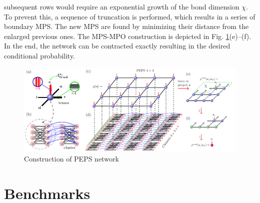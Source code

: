 subsequent rows would require an exponential growth of the bond dimension
$\chi$. To prevent this, a sequence of truncation is performed, which results
in a series of boundary MPS. The new MPS are found by minimizing their distance
from the enlarged previous ones. The MPS-MPO construction is depicted in Fig.
\ref{fig:tensors}(e)--(f). In the end, the network can be contracted exactly
resulting in the desired conditional probability.
\begin{figure}
  \includegraphics[width=\textwidth]{figures/peps.pdf}
  \caption{Construction of PEPS network} \label{fig:tensors}
\end{figure}

\section{Benchmarks}

